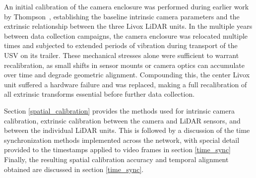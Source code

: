 \documentclass[../main.tex]{subfiles}
\begin{document}

An initial calibration of the camera enclosure was performed during earlier work by Thompson~\cite{thompson2023}, establishing the baseline intrinsic camera parameters and the extrinsic relationship between the three Livox LiDAR units.
In the multiple years between data collection campaigns, the camera enclosure was relocated multiple times and subjected to extended periods of vibration during transport of the \ac{USV} on its trailer.
These mechanical stresses alone were sufficient to warrant recalibration, as small shifts in sensor mounts or camera optics can accumulate over time and degrade geometric alignment.
Compounding this, the center Livox unit suffered a hardware failure and was replaced, making a full recalibration of all extrinsic transforms essential before further data collection.

Section \ref{spatial_calibration} provides the methods used for intrinsic camera calibration, extrinsic calibration between the camera and LiDAR sensors, and between the individual LiDAR units. 
This is followed by a discussion of the time synchronization methods implemented across the network, with special detail provided to the timestamps applied to video frames in section \ref{time_sync}
Finally, the resulting spatial calibration accuracy and temporal alignment obtained are discussed in section \ref{time_sync}.
\end{document}
